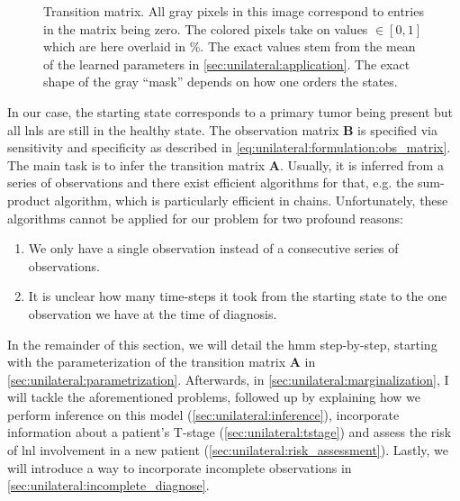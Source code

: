 \documentclass[\relativeRoot/main.tex]{subfiles}
\begin{document}
\begin{figure}
    \centering
    \def\svgwidth{0.8\textwidth}
    
    \caption{Transition matrix. All gray pixels in this image correspond to
    entries in the matrix being zero. The colored pixels take on values $\in [0, 1]$
    which are here overlaid in \%. The exact values stem from the mean of the
    learned parameters in \cref{sec:unilateral:application}. The
    exact shape of the gray ``mask'' depends on how one orders the states.}
    \label{fig:unilateral:trans_matrix}
\end{figure}

In our case, the starting state corresponds to a primary tumor being present but all \glspl{lnl} are still in the healthy state. The observation matrix $\mathbf{B}$ is specified via sensitivity and specificity as described in \cref{eq:unilateral:formulation:obs_matrix}. The main task is to infer the transition matrix $\mathbf{A}$. Usually, it is inferred from a series of observations and there exist efficient algorithms for that, e.g. the sum-product algorithm, which is particularly efficient in chains. Unfortunately, these algorithms cannot be applied for our problem for two profound reasons:

\begin{enumerate}
    \item We only have a single observation instead of a consecutive series of observations. 
    \item It is unclear how many time-steps it took from the starting state to the one observation we have at the time of diagnosis.
\end{enumerate}

In the remainder of this section, we will detail the \gls{hmm} step-by-step, starting with the parameterization of the transition matrix $\mathbf{A}$ in \cref{sec:unilateral:parametrization}. Afterwards, in \cref{sec:unilateral:marginalization}, I will tackle the aforementioned problems, followed up by explaining how we perform inference on this model (\cref{sec:unilateral:inference}), incorporate information about a patient’s T-stage (\cref{sec:unilateral:tstage}) and assess the risk of \gls{lnl} involvement in a new patient (\cref{sec:unilateral:risk_assessment}). Lastly, we will introduce a way to incorporate incomplete observations in \cref{sec:unilateral:incomplete_diagnose}.
\end{document}
